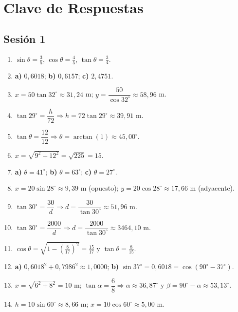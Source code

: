 \documentclass[12pt, letterpaper]{article}
\providecommand{\sen}{\sin}
\begin{document}
\ifmwclaves
\newpage
\section*{Clave de Respuestas}


\subsection*{Sesión 1}
\begin{enumerate}[leftmargin=*, label=\textbf{\arabic*.}]
  \item $\sen\theta=\frac{3}{5}$, $\cos\theta=\frac{4}{5}$, $\tan\theta=\frac{3}{4}$.
  \item \textbf{a)} $0{,}6018$; \quad \textbf{b)} $0{,}6157$; \quad \textbf{c)} $2{,}4751$.
  \item $x=50\tan 32^{\circ}\approx 31{,}24$ m; $y=\dfrac{50}{\cos 32^{\circ}}\approx 58{,}96$ m.
  \item $\tan 29^{\circ}=\dfrac{h}{72}\Rightarrow h=72\tan 29^{\circ}\approx 39{,}91$ m.
  \item $\tan\theta=\dfrac{12}{12}\Rightarrow\theta=\arctan\left(1\right)\approx 45{,}00^{\circ}$.
  \item $x=\sqrt{9^2+12^2}=\sqrt{225}=15$.
  \item \textbf{a)} $\theta=41^{\circ}$; \quad \textbf{b)} $\theta=63^{\circ}$; \quad \textbf{c)} $\theta=27^{\circ}$.
  \item $x=20\sen 28^{\circ}\approx 9{,}39$ m (opuesto); $y=20\cos 28^{\circ}\approx 17{,}66$ m (adyacente).
  \item $\tan 30^{\circ}=\dfrac{30}{d}\Rightarrow d=\dfrac{30}{\tan 30^{\circ}}\approx 51{,}96$ m.
  \item $\tan 30^{\circ}=\dfrac{2000}{d}\Rightarrow d=\dfrac{2000}{\tan 30^{\circ}}\approx 3464{,}10$ m.
  \item $\cos\theta=\sqrt{1-\left(\frac{8}{17}\right)^2}=\frac{15}{17}$ y $\tan\theta=\frac{8}{15}$.
  \item \textbf{a)} $0{,}6018^2+0{,}7986^2\approx 1{,}0000$; \quad \textbf{b)} $\sen 37^{\circ}=0{,}6018=\cos(90^{\circ}-37^{\circ})$. \checkmark
  \item $x=\sqrt{6^2+8^2}=10$ m; $\tan\alpha=\dfrac{6}{8}\Rightarrow\alpha\approx 36{,}87^{\circ}$ y $\beta=90^{\circ}-\alpha\approx 53{,}13^{\circ}$.
  \item $h=10\sen 60^{\circ}\approx 8{,}66$ m; $x=10\cos 60^{\circ}\approx 5{,}00$ m.

\end{enumerate}
\end{document}
